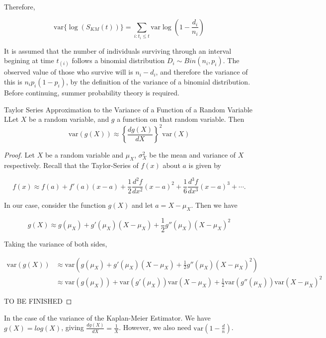 Therefore,

\[
    \text{var} \{ \log(S_{KM}(t)) \} = \sum_{i:t_i \leq t} \text{var}\log\left( 1 - \frac{d_i}{n_i}\right)
\]

It is assumed that the number of individuals surviving through an interval begining at time $t_{(i)}$ follows a binomial distribution $D_i \sim Bin(n_i, p_i)$. The observed value of those who survive will is $n_i - d_i$, and therefore the variance of this is $n_ip_i(1-p_i)$, by the definition of the variance of a binomial distribution. Before continuing, summer probability theory is required.

\begin{theorem}{Taylor Series Approximation to the Variance of a Function of a Random Variable}
    LLet $X$ be a random variable, and $g$ a function on that random variable. Then 
    \[
        \text{var}(g(X)) \approx \left\{ \frac{dg(X)}{dX} \right\}^2 \text{var}(X)
    \]
\end{theorem}
\begin{proof}
    Let $X$ be a random variable and $\mu_X$, $\sigma^2_X$ be the mean and variance of $X$ respectively. Recall that the Taylor-Series of $f(x)$ about $a$ is given by 

    \[
        f(x) \approx f(a) + f'(a)(x - a) +\frac{1}{2}\frac{d^2f}{dx^2}(x-a)^2 + \frac{1}{6}\frac{d^3f}{dx^3}(x-a)^3 + \cdots.  
    \]

    In our case, consider the function $g(X)$ and let $a = X - \mu_X$. Then we have 

    \[
        g(X) \approx g(\mu_X) + g'(\mu_X)(X-\mu_X) + \frac{1}{2}g''(\mu_X)(X - \mu_X)^2 
    \]

    Taking the variance of both sides,

    \begin{align*}
        \text{var} (g(X)) &\approx \text{var}\left( g(\mu_X) + g'(\mu_X)(X-\mu_X) + \frac{1}{2}g''(\mu_X)(X - \mu_X)^2 \right)   \\
        &\approx \text{var}(g(\mu_X)) + \text{var}(g'(\mu_X))\text{var}(X-\mu_X) + \frac{1}{2}\text{var}(g''(\mu_X))\text{var}(X - \mu_X)^2
    \end{align*}

    TO BE FINISHED

\end{proof}

In the case of the variance of the Kaplan-Meier Estimator. We have $g(X) = log(X)$, giving $\frac{dg(X)}{dX} = \frac{1}{X}$. However, we also need $\text{var}\left(1-\frac{d}{n}\right)$.